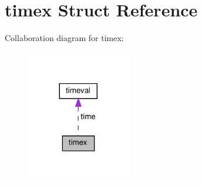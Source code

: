 \hypertarget{structtimex}{}\section{timex Struct Reference}
\label{structtimex}


Collaboration diagram for timex\+:\nopagebreak
\begin{figure}[H]
\begin{center}
\leavevmode
\includegraphics[width=128pt]{structtimex__coll__graph}
\end{center}
\end{figure}
